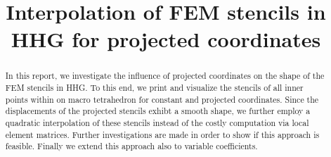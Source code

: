\documentclass[a4paper,11pt,reqno]{amsart}
\title{Interpolation of FEM stencils in HHG for projected coordinates}
\numberwithin{figure}{section}
\numberwithin{table}{section}
\numberwithin{figure}{section}
\begin{document}
\maketitle

\begin{abstract}
In this report, we investigate the influence of projected coordinates on
the shape of the FEM stencils in HHG. To this end, we print and visualize 
the stencils of all inner points within on macro tetrahedron for constant
and projected coordinates. Since the displacements of the projected stencils
exhibt a smooth shape, we further employ a quadratic interpolation of
these stencils instead of the costly computation via local element matrices.
Further investigations are made in order to show if this approach is feasible.
Finally we extend this approach also to variable coefficients.
\end{abstract}\medskip

\end{document}
